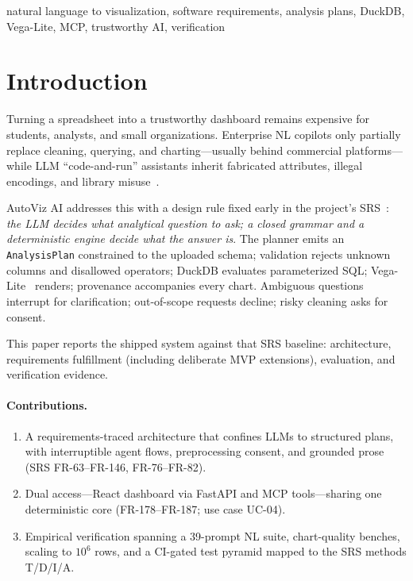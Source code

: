 \documentclass[conference]{IEEEtran}
\begin{document}
\begin{IEEEkeywords}
natural language to visualization, software requirements, analysis plans, DuckDB, Vega-Lite, MCP, trustworthy AI, verification
\end{IEEEkeywords}

\section{Introduction}
Turning a spreadsheet into a trustworthy dashboard remains expensive for students, analysts, and small organizations. Enterprise NL copilots only partially replace cleaning, querying, and charting---usually behind commercial platforms---while LLM ``code-and-run'' assistants inherit fabricated attributes, illegal encodings, and library misuse~\cite{chen2024viseval,galimzyanov2025pandasplotbench,chen2024waitgpt,wang2024insightlens}.

AutoViz AI addresses this with a design rule fixed early in the project's SRS~\cite{autovizsrs}: \emph{the LLM decides what analytical question to ask; a closed grammar and a deterministic engine decide what the answer is}. The planner emits an \texttt{AnalysisPlan} constrained to the uploaded schema; validation rejects unknown columns and disallowed operators; DuckDB evaluates parameterized SQL; Vega-Lite~\cite{satyanarayan2017vega} renders; provenance accompanies every chart. Ambiguous questions interrupt for clarification; out-of-scope requests decline; risky cleaning asks for consent.

This paper reports the shipped system against that SRS baseline: architecture, requirements fulfillment (including deliberate MVP extensions), evaluation, and verification evidence.

\paragraph{Contributions.}
\begin{enumerate}
\item A requirements-traced architecture that confines LLMs to structured plans, with interruptible agent flows, preprocessing consent, and grounded prose (SRS FR-63--FR-146, FR-76--FR-82).
\item Dual access---React dashboard via FastAPI and MCP tools---sharing one deterministic core (FR-178--FR-187; use case UC-04).
\item Empirical verification spanning a 39-prompt NL suite, chart-quality benches, scaling to $10^6$ rows, and a CI-gated test pyramid mapped to the SRS methods T/D/I/A.
\end{enumerate}
\end{document}
